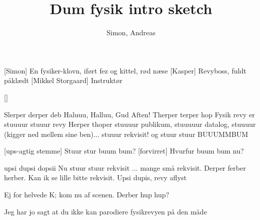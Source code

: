 \documentclass[a4paper,11pt]{article}
\title{Dum fysik intro sketch}
\author{Simon, Andreas}
\begin{document}
\maketitle

\begin{roles}
[Simon] En fysiker-klovn, iført fez og kittel, rød næse
[Kasper] Revyboss, fuldt påklædt
[Mikkel Storgaard] Instruktør
\end{roles}

\begin{props}
[]
\end{props}

\begin{sketch}

 Slerper derper deb Haluuu, Halluu, Gud Aften!
 Therper terper hop Fysik revy er stuuuur stuuur revy
 Herper thoper stuuuur publikum, stuuuuur datalog, stuuuur (kigger ned mellem sine ben)... stuuur rekvisit! og stuur stuur BUUUMMBUM


[ups-agtig stemme] Stuur stur buum bum?
[forvirret] Hvurfur buum bum nu?

 upsi dupsi dopsii Nu stuur stuur rekvisit ... mange små rekvisit.
 Derper ferber herber. Kan ik se lille bitte rekvisit. Upsi dupis, revy aflyst


 Ej for helvede K; kom nu af scenen.
 Derber hup hup?

 Jeg har jo sagt at du ikke kan parodiere fysikrevyen på den måde %




\end{sketch}
\end{document}
